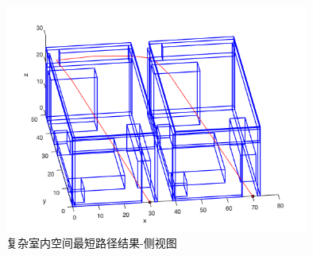 \begin{figure}[htb]
    \centering
    \caption{复杂室内空间最短路径结果-侧视图}
    \label{fig:test_complex_situation_out_lean}
    \includegraphics[width=10cm]{figures/test_complex_situation_out_lean.png}
\end{figure}

